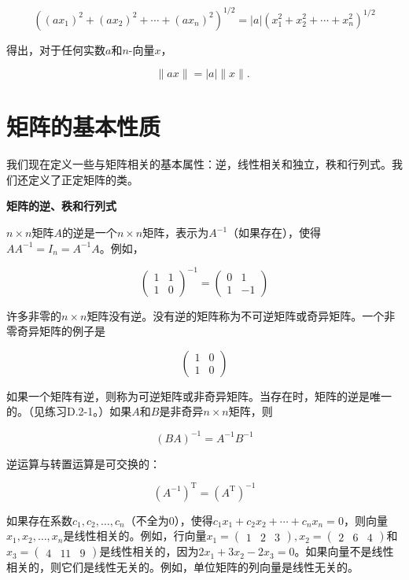 \documentclass[lang=cn,newtx,10pt,scheme=chinese]{elegantbook}
\begin{document}
$$
\left(\left(a x_1\right)^2+\left(a x_2\right)^2+\cdots+\left(a x_n\right)^2\right)^{1 / 2}=|a|\left(x_1^2+x_2^2+\cdots+x_n^2\right)^{1 / 2}
$$

得出，对于任何实数$a$和$n$-向量$x$，

$$
\|a x\|=|a|\|x\| \text {. }
$$

\section{矩阵的基本性质}\label{section:D.2}

我们现在定义一些与矩阵相关的基本属性：逆，线性相关和独立，秩和行列式。我们还定义了正定矩阵的类。

\textbf{矩阵的逆、秩和行列式}

$n \times n$矩阵$A$的逆是一个$n \times n$矩阵，表示为$A^{-1}$（如果存在），使得$A A^{-1}=I_n=A^{-1} A$。例如，

$$
\left(\begin{array}{ll}
1 & 1 \\
1 & 0
\end{array}\right)^{-1}=\left(\begin{array}{rr}
0 & 1 \\
1 & -1
\end{array}\right)
$$

许多非零的$n \times n$矩阵没有逆。没有逆的矩阵称为不可逆矩阵或奇异矩阵。一个非零奇异矩阵的例子是

$$
\left(\begin{array}{ll}
1 & 0 \\
1 & 0
\end{array}\right)
$$

如果一个矩阵有逆，则称为可逆矩阵或非奇异矩阵。当存在时，矩阵的逆是唯一的。（见练习D.2-1。）如果$A$和$B$是非奇异$n \times n$矩阵，则

$$
(B A)^{-1}=A^{-1} B^{-1}
$$

逆运算与转置运算是可交换的：

$$
\left(A^{-1}\right)^{\mathrm{T}}=\left(A^{\mathrm{T}}\right)^{-1}
$$

如果存在系数$c_1, c_2, \ldots, c_n$（不全为0），使得$c_1 x_1+c_2 x_2+\cdots+c_n x_n=0$，则向量$x_1, x_2, \ldots, x_n$是线性相关的。例如，行向量$x_1=\left(\begin{array}{lll}1 & 2 & 3\end{array}\right), x_2=\left(\begin{array}{lll}2 & 6 & 4\end{array}\right)$和$x_3=\left(\begin{array}{lll}4 & 11 & 9\end{array}\right)$是线性相关的，因为$2 x_1+3 x_2-2 x_3=0$。如果向量不是线性相关的，则它们是线性无关的。例如，单位矩阵的列向量是线性无关的。
\end{document}
